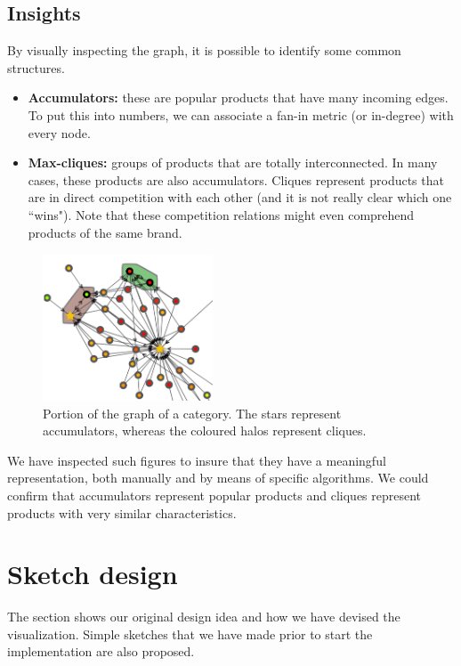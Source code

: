\documentclass[a4paper,12pt]{article}
\begin{document}
\subsection{Insights}
By visually inspecting the graph, it is possible to identify some common structures.
\begin{itemize}
	\item \textbf{Accumulators:} these are popular products that have many incoming edges. To put this into numbers, we can associate a fan-in metric (or in-degree) with every node.
	\item \textbf{Max-cliques:} groups of products that are totally interconnected. In many cases, these products are also accumulators. Cliques represent products that are in direct competition with each other (and it is not really clear which one ``wins"). Note that these competition relations might even comprehend products of the same brand.
\end{itemize}
\begin{figure}
	\centering{}
	\includegraphics[width=0.45\textwidth]{img/insights.png}
	\caption{Portion of the graph of a category. The stars represent accumulators, whereas the coloured halos represent cliques.}
	\label{fig:insights}
\end{figure}
We have inspected such figures to insure that they have a meaningful representation, both manually and by means of specific algorithms. We could confirm that accumulators represent popular products and cliques represent products with very similar characteristics.

\section{Sketch design}
\label{sec:sketch}
The section shows our original design idea and how we have devised the visualization. Simple sketches that we have made prior to start the implementation are also proposed.
\end{document}
